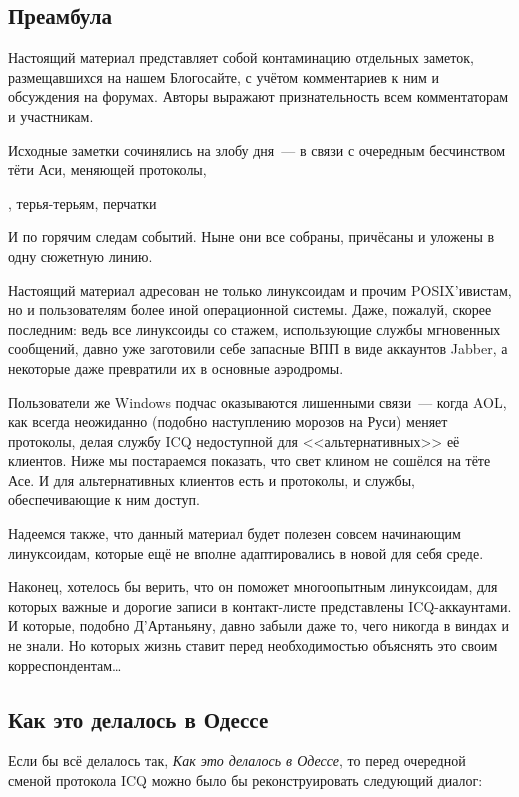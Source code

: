 \subsection{Преамбула}

Настоящий материал представляет собой контаминацию отдельных заметок, размещавшихся на нашем Блогосайте, с учётом комментариев к ним и обсуждения на форумах. Авторы выражают признательность всем комментаторам и участникам. 

Исходные заметки сочинялись на злобу дня~--- в связи с очередным бесчинством тёти Аси, меняющей протоколы, 


\begin{shadequote}{}
, терья-терьям, перчатки
\end{shadequote}

И по горячим следам событий. Ныне они все собраны, причёсаны и уложены в одну сюжетную линию. 

Настоящий материал адресован не только линуксоидам и прочим POSIX'ивистам, но и пользователям более иной операционной системы. Даже, пожалуй, скорее последним: ведь все линуксоиды со стажем, использующие службы мгновенных сообщений, давно уже заготовили себе запасные ВПП в виде аккаунтов Jabber, а некоторые даже превратили их в основные аэродромы. 

Пользователи же Windows подчас оказываются лишенными связи~--- когда AOL, как всегда неожиданно (подобно наступлению морозов на Руси) меняет протоколы, делая службу ICQ недоступной для <<альтернативных>> её клиентов. Ниже мы постараемся показать, что свет клином не сошёлся на тёте Асе. И для альтернативных клиентов есть и протоколы, и службы, обеспечивающие к ним доступ. 

Надеемся также, что данный материал будет полезен совсем начинающим линуксоидам, которые ещё не вполне адаптировались в новой для себя среде. 

Наконец, хотелось бы верить, что он поможет многоопытным линуксоидам, для которых важные и дорогие записи в контакт-листе представлены ICQ-аккаунтами. И которые, подобно Д'Артаньяну, давно забыли даже то, чего никогда в виндах и не знали. Но которых жизнь ставит перед необходимостью объяснять это своим корреспондентам\dots 

\subsection{Как это делалось в Одессе}

Если бы всё делалось так, \textit{Как это делалось в Одессе}, то перед очередной сменой протокола ICQ можно было бы реконструировать следующий диалог: 

